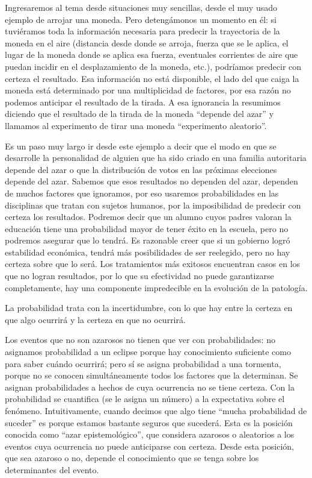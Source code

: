 \documentclass[]{article}
\begin{document}
Ingresaremos al tema desde situaciones muy sencillas, desde el muy usado
ejemplo de arrojar una moneda. Pero detengámonos un momento en él: si
tuviéramos toda la información necesaria para predecir la trayectoria de
la moneda en el aire (distancia desde donde se arroja, fuerza que se le
aplica, el lugar de la moneda donde se aplica esa fuerza, eventuales
corrientes de aire que puedan incidir en el desplazamiento de la moneda,
etc.), podríamos predecir con certeza el resultado. Esa información no
está disponible, el lado del que caiga la moneda está determinado por
una multiplicidad de factores, por esa razón no podemos anticipar el
resultado de la tirada. A esa ignorancia la resumimos diciendo que el
resultado de la tirada de la moneda ``depende del azar'' y llamamos al
experimento de tirar una moneda ``experimento aleatorio''.

Es un paso muy largo ir desde este ejemplo a decir que el modo en que se
desarrolle la personalidad de alguien que ha sido criado en una familia
autoritaria depende del azar o que la distribución de votos en las
próximas elecciones depende del azar. Sabemos que esos resultados no
dependen del azar, dependen de muchos factores que ignoramos, por eso
usaremos probabilidades en las disciplinas que tratan con sujetos
humanos, por la imposibilidad de predecir con certeza los resultados.
Podremos decir que un alumno cuyos padres valoran la educación tiene una
probabilidad mayor de tener éxito en la escuela, pero no podremos
asegurar que lo tendrá. Es razonable creer que si un gobierno logró
estabilidad económica, tendrá más posibilidades de ser reelegido, pero
no hay certeza sobre que lo será. Los tratamientos más exitosos
encuentran casos en los que no logran resultados, por lo que su
efectividad no puede garantizarse completamente, hay una componente
impredecible en la evolución de la patología.

La probabilidad trata con la incertidumbre, con lo que hay entre la
certeza en que algo ocurrirá y la certeza en que no ocurrirá.

Los eventos que no son azarosos no tienen que ver con probabilidades: no
asignamos probabilidad a un eclipse porque hay conocimiento suficiente
como para saber cuándo ocurrirá; pero sí se asigna probabilidad a una
tormenta, porque no se conocen simultáneamente todos los factores que la
determinan. Se asignan probabilidades a hechos de cuya ocurrencia no se
tiene certeza. Con la probabilidad se cuantifica (se le asigna un
número) a la expectativa sobre el fenómeno. Intuitivamente, cuando
decimos que algo tiene ``mucha probabilidad de suceder'' es porque
estamos bastante seguros que sucederá. Esta es la posición conocida como
``azar epistemológico'', que considera azarosos o aleatorios a los
eventos cuya ocurrencia no puede anticiparse con certeza. Desde esta
posición, que sea azaroso o no, depende el conocimiento que se tenga
sobre los determinantes del evento.
\end{document}
